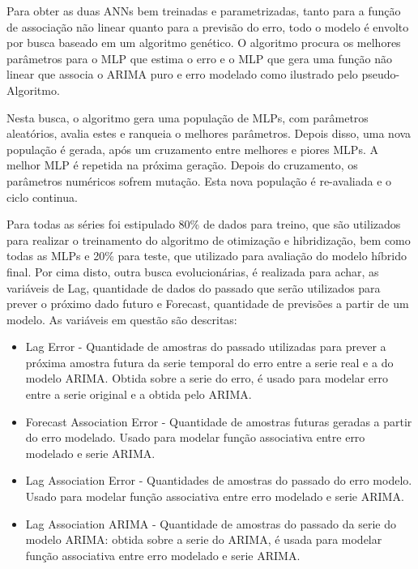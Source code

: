 Para obter as duas ANNs bem treinadas e parametrizadas, tanto para a função de associação não linear quanto para a previsão do erro, todo o modelo é envolto por busca baseado em um algoritmo genético. O algoritmo procura os melhores parâmetros para o MLP que estima o erro e o MLP que gera uma função não linear que associa o ARIMA puro e erro modelado como ilustrado pelo pseudo-Algoritmo.

Nesta busca, o algoritmo gera uma população de MLPs, com parâmetros aleatórios, avalia estes e ranqueia o melhores parâmetros. Depois disso, uma nova população é gerada, após um cruzamento entre melhores e piores MLPs. A melhor MLP é repetida na próxima geração. Depois do cruzamento, os parâmetros numéricos sofrem mutação. Esta nova população é re-avaliada e o ciclo continua.

Para todas as séries foi estipulado 80\% de dados para treino, que são utilizados para realizar o treinamento do algoritmo de otimização e hibridização, bem como todas as MLPs e 20\% para teste, que utilizado para avaliação do modelo híbrido final. Por cima disto, outra busca evolucionárias, é realizada para achar, as variáveis de Lag, quantidade de dados do passado que serão utilizados para prever o próximo dado futuro e Forecast, quantidade de previsões a partir de um modelo. As variáveis em questão são descritas:

\begin{itemize}

    \item Lag Error - Quantidade de amostras do passado utilizadas para prever a próxima amostra futura da serie temporal do erro entre a serie real e a do modelo ARIMA. Obtida sobre a serie do erro, é usado para modelar erro entre a serie original e a obtida pelo ARIMA.
    
    \item Forecast Association Error - Quantidade de amostras futuras geradas a partir do erro modelado. Usado para modelar função associativa entre erro modelado e serie ARIMA.
    
    \item Lag Association Error - Quantidades de amostras do passado do erro modelo.
    Usado para modelar função associativa entre erro modelado e serie ARIMA.
    
    \item Lag Association ARIMA - Quantidade de amostras do passado da serie do modelo ARIMA: obtida sobre a serie do ARIMA, é usada para modelar função associativa entre erro modelado e serie ARIMA.
    
\end{itemize}

